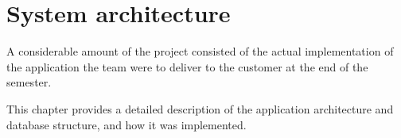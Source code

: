 \chapter{System architecture}

A considerable amount of the project consisted of the actual implementation of the application the team were to deliver to the customer at the end of the semester. 

This chapter provides a detailed description of the application architecture and database structure, and how it was implemented.



